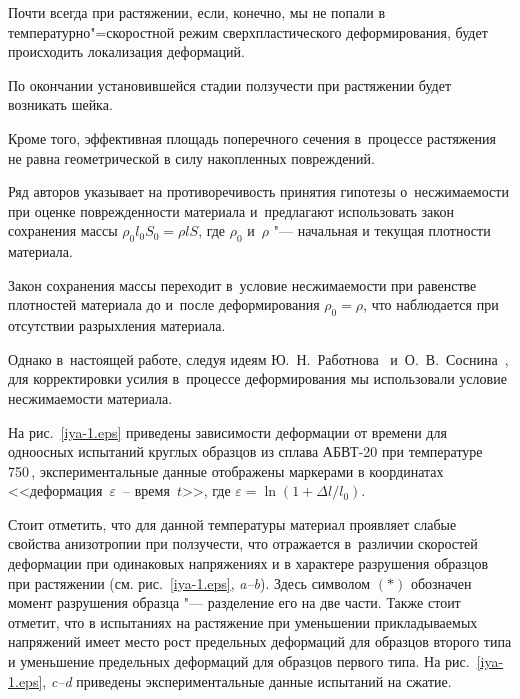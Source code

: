 Почти всегда при растяжении, если, конечно, мы не попали в температурно"=скоростной режим сверхпластического деформирования, будет происходить локализация деформаций. 

По окончании установившейся стадии ползучести при растяжении будет возникать шейка. 

Кроме того, эффективная площадь поперечного сечения в~процессе растяжения не равна геометрической в силу накопленных повреждений. 

Ряд авторов указывает на противоречивость принятия гипотезы о~несжимаемости при оценке поврежденности материала и~предлагают использовать закон сохранения массы $\rho_{0}l_{0}S_{0}=\rho l S$, где $\rho_{0}$ и~$\rho$ "--- начальная и текущая плотности материала. 

Закон сохранения массы переходит в~условие несжимаемости при равенстве плотностей материала до и~пос\-ле деформирования $\rho_{0}=\rho$, что наблюдается при отсутствии разрыхления материала. 

Однако в~настоящей работе, следуя идеям Ю.~Н.~Работнова~\cite{iya:Rabotnov} и~О.~В.~Соснина~\cite{iya:Sosnin,iya:Gorev2014}, для корректировки усилия в~процессе деформирования мы использовали условие несжимаемости материала. 



На рис.~\ref{iya-1.eps} приведены зависимости деформации от времени для одноосных испытаний круглых образцов из сплава АБВТ-20 при температуре 750\,\textcelsius, экспериментальные данные отображены маркерами в координатах <<деформация~$\varepsilon$~-- время~$t$>>, где $\varepsilon=\ln(1+\Delta l/l_0)$. 

Стоит отметить, что для данной температуры материал проявляет слабые свойства анизотропии при ползучести, что отражается в~различии скоростей деформации при одинаковых напряжениях и в характере разрушения образцов при растяжении (см. рис.~\ref{iya-1.eps}, {\sl a--b}). Здесь символом $(*)$ обозначен момент разрушения образца "--- разделение его на две части. Также стоит отметит, что в испытаниях на растяжение при уменьшении прикладываемых напряжений имеет место рост предельных деформаций для образцов второго типа и уменьшение предельных деформаций для образцов первого типа. На рис.~\ref{iya-1.eps}, {\sl c--d} приведены экспериментальные данные испытаний на сжатие.





